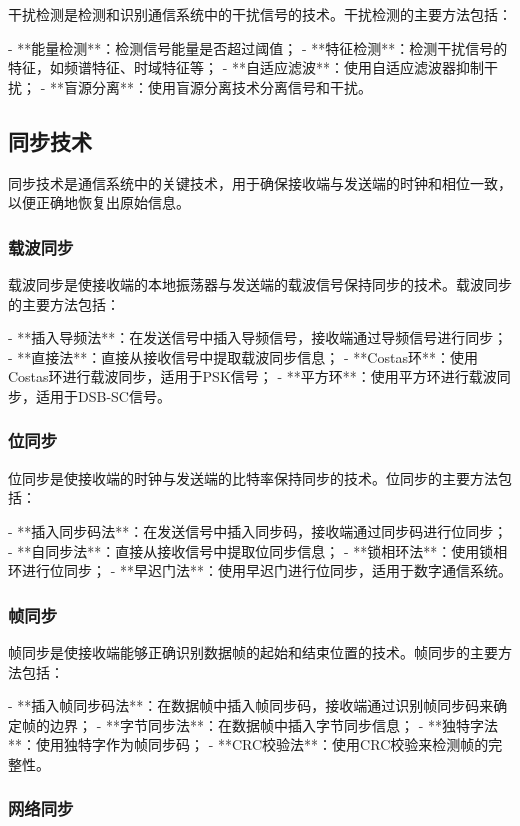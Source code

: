 ﻿\documentclass[UTF8]{ctexbook}
\begin{document}
干扰检测是检测和识别通信系统中的干扰信号的技术。干扰检测的主要方法包括：

- **能量检测**：检测信号能量是否超过阈值；
- **特征检测**：检测干扰信号的特征，如频谱特征、时域特征等；
- **自适应滤波**：使用自适应滤波器抑制干扰；
- **盲源分离**：使用盲源分离技术分离信号和干扰。
\subsection{同步技术}

同步技术是通信系统中的关键技术，用于确保接收端与发送端的时钟和相位一致，以便正确地恢复出原始信息。

\subsubsection{载波同步}

载波同步是使接收端的本地振荡器与发送端的载波信号保持同步的技术。载波同步的主要方法包括：

- **插入导频法**：在发送信号中插入导频信号，接收端通过导频信号进行同步；
- **直接法**：直接从接收信号中提取载波同步信息；
- **Costas环**：使用Costas环进行载波同步，适用于PSK信号；
- **平方环**：使用平方环进行载波同步，适用于DSB-SC信号。

\subsubsection{位同步}

位同步是使接收端的时钟与发送端的比特率保持同步的技术。位同步的主要方法包括：

- **插入同步码法**：在发送信号中插入同步码，接收端通过同步码进行位同步；
- **自同步法**：直接从接收信号中提取位同步信息；
- **锁相环法**：使用锁相环进行位同步；
- **早迟门法**：使用早迟门进行位同步，适用于数字通信系统。

\subsubsection{帧同步}

帧同步是使接收端能够正确识别数据帧的起始和结束位置的技术。帧同步的主要方法包括：

- **插入帧同步码法**：在数据帧中插入帧同步码，接收端通过识别帧同步码来确定帧的边界；
- **字节同步法**：在数据帧中插入字节同步信息；
- **独特字法**：使用独特字作为帧同步码；
- **CRC校验法**：使用CRC校验来检测帧的完整性。

\subsubsection{网络同步}
\end{document}
